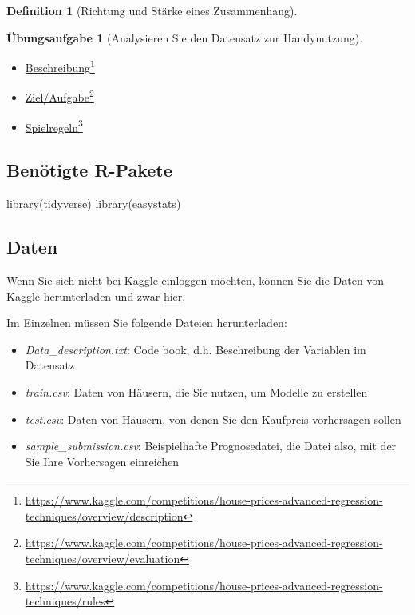 \documentclass[
  a4paper,
  DIV=11]{scrreprt}
\newenvironment{Shaded}{\begin{snugshade}}{\end{snugshade}}
\newcommand{\FunctionTok}[1]{\textcolor[rgb]{0.28,0.35,0.67}{#1}}
\newcommand{\NormalTok}[1]{\textcolor[rgb]{0.00,0.23,0.31}{#1}}
\providecommand{\tightlist}{%
  \setlength{\itemsep}{0pt}\setlength{\parskip}{0pt}}\usepackage{longtable,booktabs,array}
\theoremstyle{definition}
\newtheorem{exercise}{Übungsaufgabe}[chapter]
\theoremstyle{definition}
\theoremstyle{definition}
\newtheorem{definition}{Definition}[chapter]
\theoremstyle{remark}
\begin{document}
\begin{definition}[Richtung und Stärke eines
Zusammenhang]
\begin{exercise}[Analysieren Sie den Datensatz zur
Handynutzung]
\begin{itemize}
\tightlist
\item
  \href{https://www.kaggle.com/competitions/house-prices-advanced-regression-techniques/overview/description}{Beschreibung}\footnote{\url{https://www.kaggle.com/competitions/house-prices-advanced-regression-techniques/overview/description}}
\item
  \href{https://www.kaggle.com/competitions/house-prices-advanced-regression-techniques/overview/evaluation}{Ziel/Aufgabe}\footnote{\url{https://www.kaggle.com/competitions/house-prices-advanced-regression-techniques/overview/evaluation}}
\item
  \href{https://www.kaggle.com/competitions/house-prices-advanced-regression-techniques/rules}{Spielregeln}\footnote{\url{https://www.kaggle.com/competitions/house-prices-advanced-regression-techniques/rules}}
\end{itemize}

\subsection{Benötigte R-Pakete}\label{benuxf6tigte-r-pakete-7}

\begin{Shaded}
\begin{Highlighting}[]
\FunctionTok{library}\NormalTok{(tidyverse)}
\FunctionTok{library}\NormalTok{(easystats)}
\end{Highlighting}
\end{Shaded}

\subsection{Daten}\label{daten}

Wenn Sie sich nicht bei Kaggle einloggen möchten, können Sie die Daten
von Kaggle herunterladen und zwar
\href{https://www.kaggle.com/competitions/house-prices-advanced-regression-techniques/data}{hier}.

Im Einzelnen müssen Sie folgende Dateien herunterladen:

\begin{itemize}
\tightlist
\item
  \emph{Data\_description.txt}: Code book, d.h. Beschreibung der
  Variablen im Datensatz
\item
  \emph{train.csv}: Daten von Häusern, die Sie nutzen, um Modelle zu
  erstellen
\item
  \emph{test.csv}: Daten von Häusern, von denen Sie den Kaufpreis
  vorhersagen sollen
\item
  \emph{sample\_submission.csv}: Beispielhafte Prognosedatei, die Datei
  also, mit der Sie Ihre Vorhersagen einreichen
\end{itemize}


\end{exercise}
\end{definition}
\end{document}
